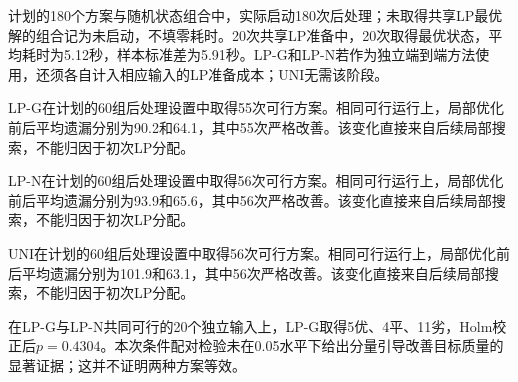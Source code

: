 计划的180个方案与随机状态组合中，实际启动180次后处理；未取得共享LP最优解的组合记为未启动，不填零耗时。20次共享LP准备中，20次取得最优状态，平均耗时为5.12秒，样本标准差为5.91秒。LP-G和LP-N若作为独立端到端方法使用，还须各自计入相应输入的LP准备成本；UNI无需该阶段。

LP-G在计划的60组后处理设置中取得55次可行方案。相同可行运行上，局部优化前后平均遗漏分别为90.2和64.1，其中55次严格改善。该变化直接来自后续局部搜索，不能归因于初次LP分配。

LP-N在计划的60组后处理设置中取得56次可行方案。相同可行运行上，局部优化前后平均遗漏分别为93.9和65.6，其中56次严格改善。该变化直接来自后续局部搜索，不能归因于初次LP分配。

UNI在计划的60组后处理设置中取得56次可行方案。相同可行运行上，局部优化前后平均遗漏分别为101.9和63.1，其中56次严格改善。该变化直接来自后续局部搜索，不能归因于初次LP分配。

在LP-G与LP-N共同可行的20个独立输入上，LP-G取得5优、4平、11劣，Holm校正后$p=0.4304$。本次条件配对检验未在0.05水平下给出分量引导改善目标质量的显著证据；这并不证明两种方案等效。

